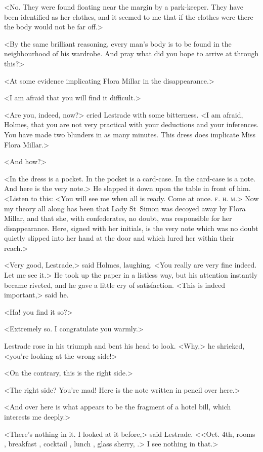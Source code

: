 <No. They were found floating near the margin by a park-keeper. They have been identified as her clothes, and it seemed to me that if the clothes were there the body would not be far off.>

<By the same brilliant reasoning, every man's body is to be found in the neighbourhood of his wardrobe. And pray what did you hope to arrive at through this?>

<At some evidence implicating Flora Millar in the disappearance.>

<I am afraid that you will find it difficult.>

<Are you, indeed, now?> cried Lestrade with some bitterness. <I am afraid, Holmes, that you are not very practical with your deductions and your inferences. You have made two blunders in as many minutes. This dress does implicate Miss Flora Millar.>

<And how?>

<In the dress is a pocket. In the pocket is a card-case. In the card-case is a note. And here is the very note.> He slapped it down upon the table in front of him. <Listen to this: <You will see me when all is ready. Come at once. \textsc{f. h. m.}> Now my theory all along has been that Lady St~Simon was decoyed away by Flora Millar, and that she, with confederates, no doubt, was responsible for her disappearance. Here, signed with her initials, is the very note which was no doubt quietly slipped into her hand at the door and which lured her within their reach.>

<Very good, Lestrade,> said Holmes, laughing. <You really are very fine indeed. Let me see it.> He took up the paper in a listless way, but his attention instantly became riveted, and he gave a little cry of satisfaction. <This is indeed important,> said he.

<Ha! you find it so?>

<Extremely so. I congratulate you warmly.>

Lestrade rose in his triumph and bent his head to look. <Why,> he shrieked, <you're looking at the wrong side!>

<On the contrary, this is the right side.>

<The right side? You're mad! Here is the note written in pencil over here.>

<And over here is what appears to be the fragment of a hotel bill, which interests me deeply.>

<There's nothing in it. I looked at it before,> said Lestrade. <<Oct. 4th, rooms , breakfast , cocktail , lunch , glass sherry, .> I see nothing in that.>

